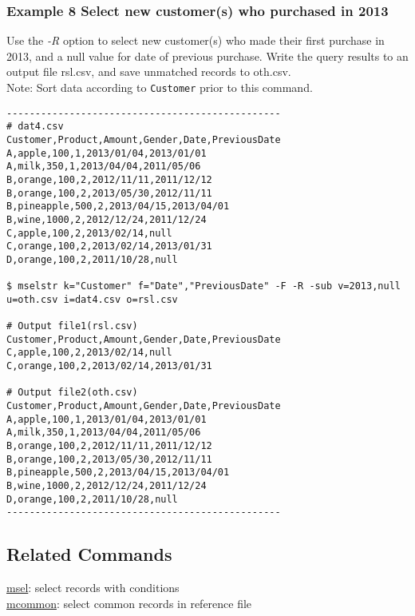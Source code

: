 \documentclass[a4paper]{jarticle}
\begin{document}
\subsubsection*{Example 8 Select new customer(s) who purchased in 2013}
Use the \emph{-R} option to select new customer(s) who made their first purchase in 2013, and a null value for date of previous purchase. 
Write the query results to an output file rsl.csv, and save unmatched records to oth.csv. \\
Note: Sort data according to \verb|Customer| prior to this command. 

\begin{verbatim}
------------------------------------------------
# dat4.csv
Customer,Product,Amount,Gender,Date,PreviousDate
A,apple,100,1,2013/01/04,2013/01/01
A,milk,350,1,2013/04/04,2011/05/06
B,orange,100,2,2012/11/11,2011/12/12
B,orange,100,2,2013/05/30,2012/11/11
B,pineapple,500,2,2013/04/15,2013/04/01
B,wine,1000,2,2012/12/24,2011/12/24
C,apple,100,2,2013/02/14,null
C,orange,100,2,2013/02/14,2013/01/31
D,orange,100,2,2011/10/28,null

$ mselstr k="Customer" f="Date","PreviousDate" -F -R -sub v=2013,null u=oth.csv i=dat4.csv o=rsl.csv

# Output file1(rsl.csv)
Customer,Product,Amount,Gender,Date,PreviousDate
C,apple,100,2,2013/02/14,null
C,orange,100,2,2013/02/14,2013/01/31

# Output file2(oth.csv)
Customer,Product,Amount,Gender,Date,PreviousDate
A,apple,100,1,2013/01/04,2013/01/01
A,milk,350,1,2013/04/04,2011/05/06
B,orange,100,2,2012/11/11,2011/12/12
B,orange,100,2,2013/05/30,2012/11/11
B,pineapple,500,2,2013/04/15,2013/04/01
B,wine,1000,2,2012/12/24,2011/12/24
D,orange,100,2,2011/10/28,null
------------------------------------------------
\end{verbatim}

\subsection*{Related Commands}
\noindent
\href{run:msel.pdf}{msel}: select records with conditions\\
\href{run:mcommon.pdf}{mcommon}: select common records in reference file
\end{document}
